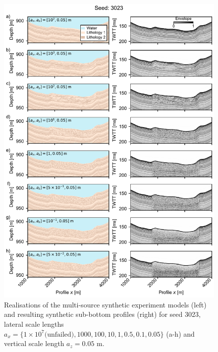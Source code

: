 \documentclass[se,manuscript]{copernicus}
\begin{document}
\begin{figure}
    \includegraphics{figures/si_fig06.pdf}
    \caption{Realisations of the multi-source synthetic experiment models (left) and resulting synthetic sub-bottom profiles (right) for seed 3023, lateral scale lengths $a_x=\{1 \times 10^7 \text{(unfailed)}, 1000, 100, 10, 1, 0.5, 0.1, 0.05\}$ (a-h) and vertical scale length $a_z=0.05$ m.}
    \label{fig:multi-source-3023}
\end{figure}
\end{document}
